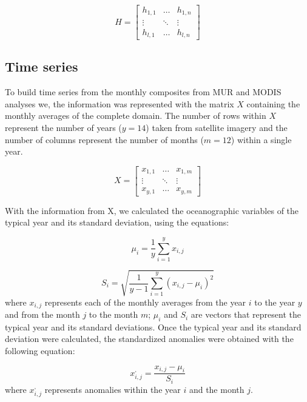 \documentclass{article} %
\begin{document}
\begin{equation*}
H=
\begin{bmatrix}
    h_{1,1} & \dots  & h_{1,n} \\
    \vdots & \ddots & \vdots \\
    h_{l,1} & \dots  & h_{l,n}
\end{bmatrix}
\end{equation*}

\subsection{Time series}

To build time series from the monthly composites from MUR and MODIS analyses we, the information was represented with the matrix $X$ containing the monthly averages of the complete domain. The number of rows within $X$ represent the number of years ($y=14$) taken from satellite imagery and the number of columns represent the number of months ($m=12$) within a single year.

\begin{equation*}
X=
\begin{bmatrix}
    x_{1,1} & \dots  & x_{1,m} \\
    \vdots & \ddots & \vdots \\
    x_{y,1} & \dots  & x_{y,m}
\end{bmatrix}
\end{equation*}

With the information from X, we calculated the oceanographic variables of the typical year and its standard deviation, using the equations:

\begin{equation*}
\mu_{i}=\frac{1}{y} \sum_{i=1}^{y} x_{i,j} 
\end{equation*}

\begin{equation*}
S_{i}= \sqrt{\frac{1}{y-1} \sum_{i=1}^{y} (x_{i,j}-\mu_{i})^{2} }
\end{equation*}
where $x_{i,j}$ represents each of the monthly averages from the year $i$ to the year $y$ and from the month $j$ to the month $m$; $\mu_{i}$ and $S_{i}$ are vectors that represent the typical year and its standard deviations. Once the typical year and its standard deviation were calculated, the standardized anomalies were obtained with the following equation:

\begin{equation*}
x_{i,j}^{,}=\frac{x_{i,j}-\mu_{i}}{S_{i}}
\end{equation*}
where $x_{i,j}^{,}$ represents anomalies within the year $i$ and the month $j$.
\end{document}
